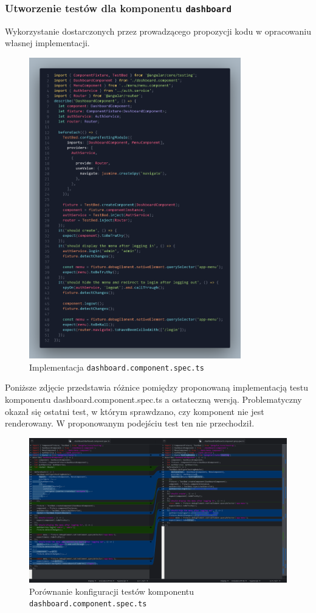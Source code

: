 \documentclass[12pt]{article}
\begin{document}
\subsubsection{Utworzenie testów dla komponentu \texttt{dashboard}}
Wykorzystanie dostarczonych przez prowadzącego propozycji kodu w opracowaniu własnej implementacji.
\begin{figure}[H]
  \centering
  \includegraphics[width=0.82\textwidth,keepaspectratio]{image-13.png}
  \caption{Implementacja \texttt{dashboard.component.spec.ts}}
  \label{fig:image-13}
\end{figure}
Poniższe zdjęcie przedstawia różnice pomiędzy proponowaną implementacją testu komponentu dashboard.component.spec.ts a ostateczną wersją. Problematyczny okazał się ostatni test, w którym sprawdzano, czy komponent nie jest renderowany. W proponowanym podejściu test ten nie przechodził.
\begin{figure}[H]
  \centering
  \includegraphics[width=1\textwidth,keepaspectratio]{image-19.png}
  \caption{Porównanie konfiguracji testów komponentu \texttt{dashboard.component.spec.ts}}
  \label{fig:image-19}
\end{figure}
\end{document}
